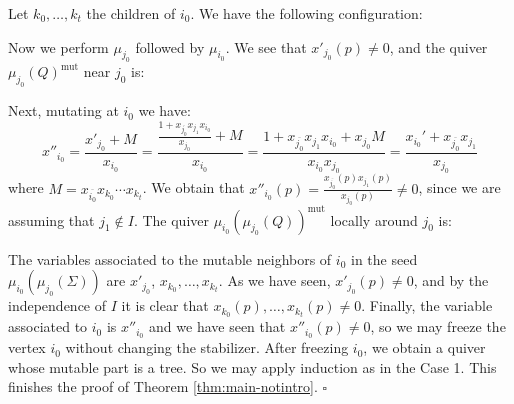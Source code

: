\documentclass{amsart}
\newcommand{\seed}{\Sigma}
\newcommand{\mut}{\mathrm{mut}}
\numberwithin{equation}{section}
\theoremstyle{definition}
\begin{document}
Let $k_0, \dots, k_{t}$ the children of $i_0$. We have the following configuration:
\begin{center}
\end{center}
Now we perform $\mu_{j_0}$ followed by $\mu_{i_0}$. We see that $x'_{j_0}(p) \neq 0$, and the quiver $\mu_{j_0}(Q)^{\mut}$ near $j_0$ is:
\begin{center}
\end{center}
Next, mutating at $i_0$ we have:
\[
x''_{i_0} = \frac{x'_{j_0} + M}{x_{i_0}} = \frac{\frac{1 + x_{\overline{j_0}}x_{j_1}x_{i_0}}{x_{j_0}} + M}{x_{i_0}} = \frac{1 + x_{\overline{j_0}}x_{j_1}x_{i_0} + x_{j_0}M}{x_{i_0}x_{j_0}} = \frac{x_{i_0}' + x_{\overline{j_0}}x_{j_1}}{x_{j_0}}
\]
where $M = x_{\overline{i_0}}x_{k_0}\cdots x_{k_t}$. We obtain that $x''_{i_0}(p) = \frac{x_{\overline{j_0}}(p)x_{j_1}(p)}{x_{j_0}(p)} \neq 0$, since we are assuming that $j_1 \notin I$. The quiver $\mu_{i_0}(\mu_{j_0}(Q))^{\mut}$ locally around $j_0$ is:
\begin{center}
\end{center}
The variables associated to the mutable neighbors of $i_0$ in the seed $\mu_{i_0}(\mu_{j_0}(\seed))$ are $x'_{j_0}$, $x_{k_0}, \dots, x_{k_t}$. As we have seen, $x'_{j_0}(p) \neq 0$, and by the independence of $I$ it is clear that $x_{k_0}(p), \dots, x_{k_t}(p) \neq 0$. Finally, the variable associated to $i_0$ is $x''_{i_0}$ and we have seen that $x''_{i_0}(p) \neq 0$, so we may freeze the vertex $i_0$ without changing the stabilizer. After freezing $i_0$, we obtain a quiver whose mutable part is a tree. So we may apply induction as in the Case 1. This finishes the proof of Theorem \ref{thm:main-notintro}. 
\hfill $\square$
\end{document}
